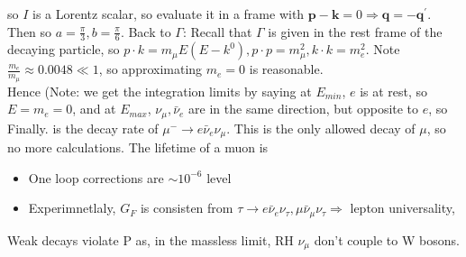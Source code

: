 \documentclass{article}
\begin{document}
so 
$I$ is a Lorentz scalar, so evaluate it in a frame with $\bm{p}-\bm{k} = 0 \Rightarrow \bm{q} = - \bm{q}^\prime$. Then 
so $a = \frac{\pi}{3}, b = \frac{\pi}{6}$. Back to $\Gamma$:
Recall that $\Gamma$ is given in the rest frame of the decaying particle, so $p\cdot k = m_\mu E (E-k^0), p\cdot p = m_\mu^2, k \cdot k = m_e^2$. Note $\frac{m_e}{m_\mu} \approx 0.0048 \ll 1$, so approximating $m_e = 0$ is reasonable. \\
Hence
(Note: we get the integration limits by saying at $E_{min}$, $e$ is at rest, so $E=m_e = 0$, and at $E_{max}$, $\nu_\mu, \bar{\nu}_e$ are in the same direction, but opposite to $e$, so 
Finally. 
is the decay rate of $\mu^- \to e \bar{\nu}_e \nu_\mu$. This is the only allowed decay of $\mu$, so no more calculations. The lifetime of a muon is 

\begin{itemize}
\item One loop corrections are $\sim 10^{-6}$ level
\item Experimnetlaly, $G_F$ is consisten from $\tau \to e \bar{\nu}_e \nu_\tau, \mu \bar{\nu}_\mu \nu_\tau \Rightarrow$ lepton universality, 
\end{itemize}

Weak decays violate P as, in the massless limit, RH $\nu_\mu$ don't couple to W bosons. 

\end{document}
